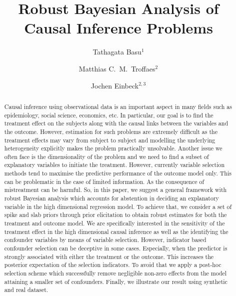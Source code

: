\documentclass{amsart}
\begin{document}
\title{Robust Bayesian Analysis of Causal Inference Problems}
\author{Tathagata Basu$^1$}
\author{Matthias C.~M.~Troffaes$^2$}
\author{Jochen Einbeck$^{2,3}$}
\address{$^1$Civil and Environmental Engineering, University of Strathclyde}
\address{$^2$Department of Mathematical Sciences, Durham University}
\address{$^3$Durham Research Methods Centre}

\begin{abstract}
Causal inference using observational data is an important aspect in
many fields such as epidemiology, social science, economics, etc. In
particular, our goal is to find the treatment effect on the subjects
along with the causal links between the variables and the outcome.
However, estimation for such problems are extremely 
difficult as the treatment effects may vary from subject 
to subject and modelling the underlying heterogeneity explicitly makes the 
problem practically unsolvable. Another issue we often face is the 
dimensionality of the problem and we need to find a subset of 
explanatory variables to initiate the treatment. However, currently variable selection methods
tend to maximise the predictive performance of the outcome model only. This can be problematic in the case of limited information. 
As the consequence of mistreatment can be harmful. 
So, in this paper, we suggest a general framework with
robust Bayesian analysis which accounts for abstention in deciding
an explanatory variable in the high dimensional regression model. 
To achieve that, we consider a set of spike and slab priors 
through prior elicitation to obtain robust estimates for
both the treatment and outcome model. We are specifically interested 
in the sensitivity of the treatment effect in the high dimensional causal inference
as well as the identifying the confounder variables by means of variable selection. However, indicator
based confounder selection can be deceptive in some cases. Especially, 
when the predictor is strongly associated with either the treatment or 
the outcome. This increases the posterior expectation of the selection
indicators. To avoid that we apply a post-hoc selection scheme
which successfully remove negligible non-zero effects from the model
attaining a smaller set of confounders. Finally, we illustrate
our result using synthetic \alert{and real} dataset.

\end{abstract}

\maketitle
\end{document}
